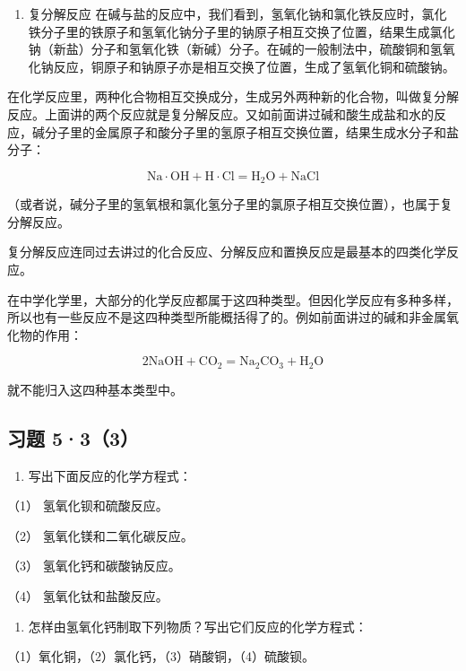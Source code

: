 \begin{enumerate}[start=3]
\item
  复分解反应
  在碱与盐的反应中，我们看到，氢氧化钠和氯化铁反应时，氯化铁分子里的铁原子和氢氧化钠分子里的钠原子相互交换了位置，结果生成氯化钠（新盐）分子和氢氧化铁（新碱）分子。在碱的一般制法中，硫酸铜和氢氧化钠反应，铜原子和钠原子亦是相互交换了位置，生成了氢氧化铜和硫酸钠。
\end{enumerate}

在化学反应里，两种化合物相互交换成分，生成另外两种新的化合物，叫做复分解反应。上面讲的两个反应就是复分解反应。又如前面讲过碱和酸生成盐和水的反应，碱分子里的金属原子和酸分子里的氢原子相互交换位置，结果生成水分子和盐分子：

\[
\mathrm{Na} \cdot \mathrm{OH} + \mathrm{H} \cdot \mathrm{Cl} = \mathrm{H}_{2} \mathrm{O} + \mathrm{NaCl}
\]

（或者说，碱分子里的氢氧根和氯化氢分子里的氯原子相互交换位置），也属于复分解反应。

复分解反应连同过去讲过的化合反应、分解反应和置换反应是最基本的四类化学反应。

在中学化学里，大部分的化学反应都属于这四种类型。但因化学反应有多种多样，所以也有一些反应不是这四种类型所能概括得了的。例如前面讲过的碱和非金属氧化物的作用：

\[
2 \mathrm{NaOH} + \mathrm{CO}_{2} = \mathrm{Na}_{2} \mathrm{CO}_{3} + \mathrm{H}_{2} \mathrm{O}
\]

就不能归入这四种基本类型中。

\subsection{习题 5·3（3）}

\begin{enumerate}
\item
  写出下面反应的化学方程式：
\end{enumerate}

（1） 氢氧化钡和硫酸反应。

（2） 氢氧化镁和二氧化碳反应。

（3） 氢氧化钙和碳酸钠反应。

（4） 氢氧化钛和盐酸反应。

\begin{enumerate}[start=2]
\item
  怎样由氢氧化钙制取下列物质？写出它们反应的化学方程式：
\end{enumerate}

（1）氧化铜，（2）氯化钙，（3）硝酸铜，（4）硫酸钡。


